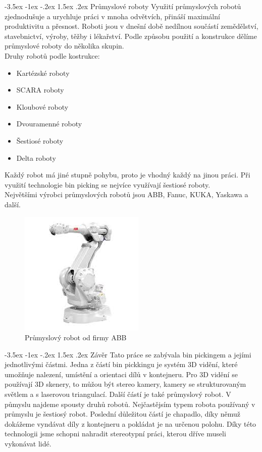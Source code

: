 \documentclass[a4paper,11pt]{article}
\makeatletter
\theoremstyle{definition}
\renewcommand\section{\@startsection {section}{1}{\z@}%
                                   {-3.5ex \@plus -1ex \@minus -.2ex}%
                                   {1.5ex \@plus.2ex}%
                                   {\large\bfseries}}
\makeatother
\begin{document}
\section{Průmyslové roboty}
\label{sec:4}
Využití průmyslových robotů zjednodušuje a urychluje práci v mnoha odvětvích, přináší maximální produktivitu a přesnost. Roboti jsou v dnešní době nedílnou součástí zemědělství, stavebnictví, výroby, těžby i lékařství. Podle způsobu použití a konstrukce dělíme průmyslové roboty do několika skupin.
\\ Druhy robotů podle kostrukce:
\begin{itemize}
\item Kartézské roboty
\item SCARA roboty
\item Kloubové roboty
\item Dvouramenné roboty
\item Šestiosé roboty
\item Delta roboty
\end{itemize}
Každý robot má jiné stupně pohybu, proto je vhodný každý na jinou práci. Při využití technologie bin picking se nejvíce využívají šestiosé roboty. 
\\Největšími výrobci průmyslových robotů jsou ABB, Fanuc, KUKA, Yaskawa a další.
\begin{figure}[h]
\begin{center}
\includegraphics[scale=1.2]{image/robot.jpg}
\caption{Průmyslový robot od firmy ABB}
\label{fig:6}
\end{center}
\end{figure}


\newpage
\section{Závěr}
\label{sec:5}
Tato práce se zabývala bin pickingem a jejími jednotlivými částmi. Jedna z částí bin pickkingu je systém 3D vidění, které umožňuje nalezení, umístění a orientaci dílů v kontejneru. Pro 3D vidění se používají 3D skenery, to můžou být stereo kamery, kamery se strukturovaným světlem a s laserovou triangulací. Další částí je také průmyslový robot. V půmyslu najdeme spousty druhů robotů. Nejčastějsím typem robota používaný v průmyslu je šestiosý robot. Poslední důležitou částí je chapadlo, díky němuž dokážeme vyndávat díly z kontejneru a pokládat je na určenou polohu. Díky této technologii jsme schopni nahradit stereotypní práci, kterou dříve museli vykonávat lidé. 
\end{document}
